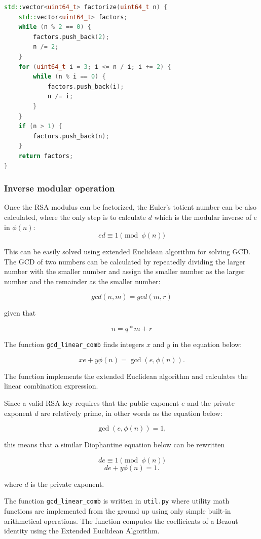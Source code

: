 \documentclass[11pt,a4paper]{article}
\begin{document}
\begin{lstlisting}[language=C++]
std::vector<uint64_t> factorize(uint64_t n) {
    std::vector<uint64_t> factors;
    while (n % 2 == 0) {
        factors.push_back(2);
        n /= 2;
    }
    for (uint64_t i = 3; i <= n / i; i += 2) {
        while (n % i == 0) {
            factors.push_back(i);
            n /= i;
        }
    }
    if (n > 1) {
        factors.push_back(n);
    }
    return factors;
}
\end{lstlisting}

\subsubsection*{Inverse modular operation}

Once the RSA modulus can be factorized, the Euler's totient number can be also calculated, where the only step is to calculate $d$ which is the modular inverse of $e$ in $\phi(n)$:
$$ed \equiv 1 \pmod{\phi(n)}$$

This can be easily solved using extended Euclidean algorithm for solving GCD. The GCD of two numbers can be calculated by repeatedly dividing the larger number with the smaller number and assign the smaller number as the larger number and the remainder as the smaller number:

$$gcd(n, m) = gcd(m, r)$$

given that

$$n = q*m + r$$

The function \texttt{gcd\_linear\_comb} finds integers $x$ and $y$ in the equation below:

\[
xe+y\phi(n)=\gcd(e,\phi(n)).
\]

The function implements the extended Euclidean algorithm and calculates the linear combination expression.

Since a valid RSA key requires that the public exponent $e$ and the private exponent $d$ are relatively prime, in other words as the equation below:

\[
\gcd(e,\phi(n))=1,
\]

this means that a similar Diophantine equation below can be rewritten

\[
de \equiv 1 \pmod{\phi(n)}
\]
\[
de+y\phi(n)=1.
\]

where $d$ is the private exponent.

The function \texttt{gcd\_linear\_comb} is written in \texttt{util.py} where utility math functions are implemented from the ground up using only simple built-in arithmetical operations. The function computes the coefficients of a Bezout identity using the Extended Euclidean Algorithm.
\end{document}
